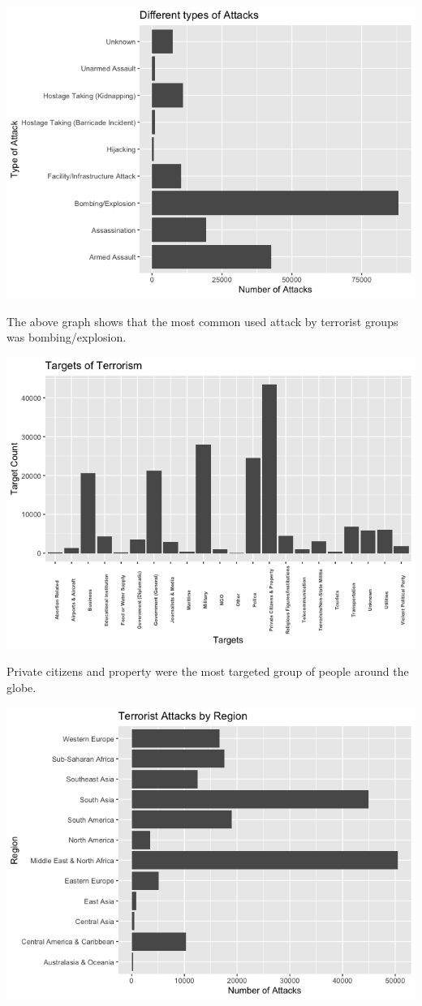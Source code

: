 \documentclass[
]{article}
\begin{document}
\includegraphics{README_files/figure-gfm/unnamed-chunk-9-1.png}

The above graph shows that the most common used attack by terrorist
groups was bombing/explosion.

\includegraphics{README_files/figure-gfm/unnamed-chunk-10-1.png}

Private citizens and property were the most targeted group of people
around the globe.

\includegraphics{README_files/figure-gfm/unnamed-chunk-11-1.png}
\end{document}
